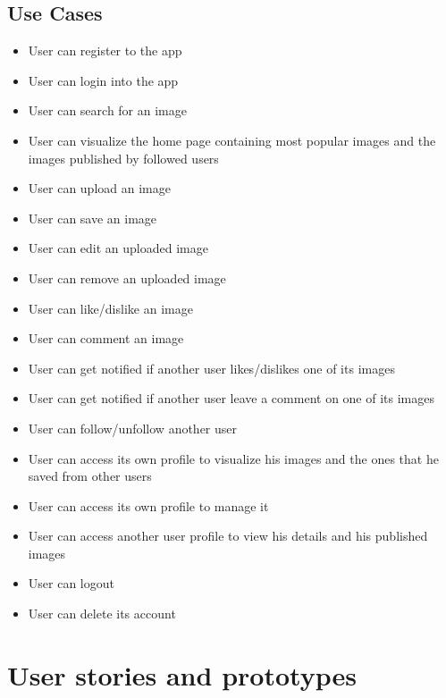 \documentclass[11pt, a4paper]{article}
\begin{document}
\subsection{Use Cases}
\begin{itemize}
    \item User can register to the app
    \item User can login into the app
    \item User can search for an image
    \item User can visualize the home page containing most popular images and the images published by followed users 
    \item User can upload an image
    \item User can save an image
    \item User can edit an uploaded image
    \item User can remove an uploaded image
    \item User can like/dislike an image
    \item User can comment an image
    \item User can get notified if another user likes/dislikes one of its images
    \item User can get notified if another user leave a comment on one of its images
    \item User can follow/unfollow another user
    \item User can access its own profile to visualize his images and the ones that he saved from other users
    \item User can access its own profile to manage it
    \item User can access another user profile to view his details and his published images
    \item User can logout
    \item User can delete its account
\end{itemize}


\newpage

\section{User stories and prototypes}
\end{document}
